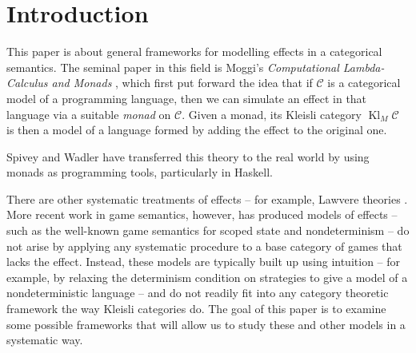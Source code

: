 \documentclass{svproc}
\newcommand\C{\mathcal{C}}
\newcommand{\0}{{\mathtt{0}}} \newcommand{\com}{{\mathtt{com}}}
\DeclareMathOperator{\Kl}{Kl}
\begin{document}
\section{Introduction}

This paper is about general frameworks for modelling effects in a categorical semantics.  
The seminal paper in this field is Moggi's \emph{Computational Lambda-Calculus and Monads} \cite{Moggi}, which first put forward the idea that if $\C$ is a categorical model of a programming language, then we can simulate an effect in that language via a suitable \emph{monad} on $\C$.  
Given a monad, its Kleisli category $\Kl_M\C$ is then a model of a language formed by adding the effect to the original one.  

Spivey \cite{Spivey} and Wadler \cite{Wadler1,Wadler2} have transferred this theory to the real world by using monads as programming tools, particularly in Haskell.

There are other systematic treatments of effects -- for example, Lawvere theories \cite{Lawvere}.  
More recent work in game semantics, however, has produced models of effects -- such as the well-known game semantics for scoped state \cite{SamsonGuyIAPassive} and nondeterminism \cite{mcCHFiniteND} -- do not arise by applying any systematic procedure to a base category of games that lacks the effect.  
Instead, these models are typically built up using intuition -- for example, by relaxing the determinism condition on strategies to give a model of a nondeterministic language -- and do not readily fit into any category theoretic framework the way Kleisli categories do.  
The goal of this paper is to examine some possible frameworks that will allow us to study these and other models in a systematic way.  
\end{document}
